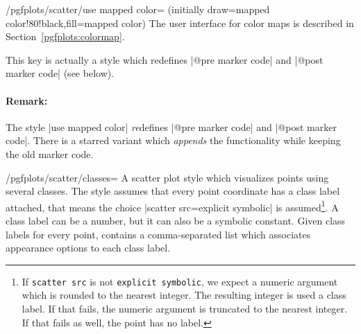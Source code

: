 {\begin{stylekey}{/pgfplots/scatter/use mapped color= (initially draw=mapped color!80!black,fill=mapped color)}
	The user interface for color maps is described in Section~\ref{pgfplots:colormap}.
\begin{codeexample}[]
\end{codeexample}

\begin{codeexample}[]
\end{codeexample}

\begin{codeexample}[]
\end{codeexample}
	This key is actually a style which redefines |@pre marker code| and |@post marker code| (see below).

	\paragraph{Remark:} The style |use mapped color| \emph{re}defines |@pre marker code| and |@post marker code|. There is a starred variant  which \emph{appends} the functionality while keeping the old marker code.
\end{stylekey}

\begin{stylekey}{/pgfplots/scatter/classes=}
\label{pgfplots:scatterclasses}
	A scatter plot style which visualizes points using several classes. The style assumes that every point coordinate has a class label attached, that means the choice |scatter src=explicit symbolic| is assumed\footnote{If \texttt{scatter src} is not \texttt{explicit symbolic}, we expect a numeric argument which is rounded to the nearest integer. The resulting integer is used a class label. If that fails, the numeric argument is truncated to the nearest integer. If that fails as well, the point has no label.}. A class label can be a number, but it can also be a symbolic constant. Given class labels for every point,  contains a comma-separated list which associates appearance options to each class label.


\end{stylekey}}
